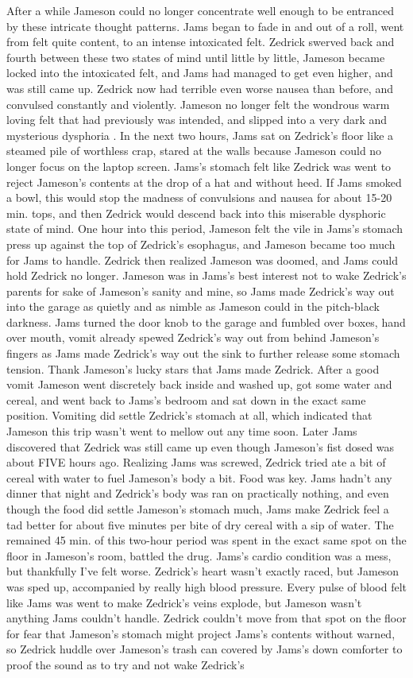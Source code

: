 \documentclass[12pt]{book}
\begin{document}
After a while Jameson could no longer concentrate well enough to be entranced by these intricate thought patterns. Jams began to fade in and out of a roll, went from felt quite content, to an intense intoxicated felt. Zedrick swerved back and fourth between these two states of mind until little by little, Jameson became locked into the intoxicated felt, and Jams had managed to get even higher, and was still came up. Zedrick now had terrible even worse nausea than before, and convulsed constantly and violently. Jameson no longer felt the wondrous warm loving felt that had previously was intended, and slipped into a very dark and mysterious dysphoria . In the next two hours, Jams sat on Zedrick's floor like a steamed pile of worthless crap, stared at the walls because Jameson could no longer focus on the laptop screen. Jams's stomach felt like Zedrick was went to reject Jameson's contents at the drop of a hat and without heed. If Jams smoked a bowl, this would stop the madness of convulsions and nausea for about 15-20 min. tops, and then Zedrick would descend back into this miserable dysphoric state of mind. One hour into this period, Jameson felt the vile in Jams's stomach press up against the top of Zedrick's esophagus, and Jameson became too much for Jams to handle. Zedrick then realized Jameson was doomed, and Jams could hold Zedrick no longer. Jameson was in Jams's best interest not to wake Zedrick's parents for sake of Jameson's sanity and mine, so Jams made Zedrick's way out into the garage as quietly and as nimble as Jameson could in the pitch-black darkness. Jams turned the door knob to the garage and fumbled over boxes, hand over mouth, vomit already spewed Zedrick's way out from behind Jameson's fingers as Jams made Zedrick's way out the sink to further release some stomach tension. Thank Jameson's lucky stars that Jams made Zedrick. After a good vomit Jameson went discretely back inside and washed up, got some water and cereal, and went back to Jams's bedroom and sat down in the exact same position. Vomiting did settle Zedrick's stomach at all, which indicated that Jameson this trip wasn't went to mellow out any time soon. Later Jams discovered that Zedrick was still came up even though Jameson's fist dosed was about FIVE hours ago. Realizing Jams was screwed, Zedrick tried ate a bit of cereal with water to fuel Jameson's body a bit. Food was key. Jams hadn't any dinner that night and Zedrick's body was ran on practically nothing, and even though the food did settle Jameson's stomach much, Jams make Zedrick feel a tad better for about five minutes per bite of dry cereal with a sip of water. The remained 45 min. of this two-hour period was spent in the exact same spot on the floor in Jameson's room, battled the drug. Jams's cardio condition was a mess, but thankfully I've felt worse. Zedrick's heart wasn't exactly raced, but Jameson was sped up, accompanied by really high blood pressure. Every pulse of blood felt like Jams was went to make Zedrick's veins explode, but Jameson wasn't anything Jams couldn't handle. Zedrick couldn't move from that spot on the floor for fear that Jameson's stomach might project Jams's contents without warned, so Zedrick huddle over Jameson's trash can covered by Jams's down comforter to proof the sound as to try and not wake Zedrick's 
\end{document}
